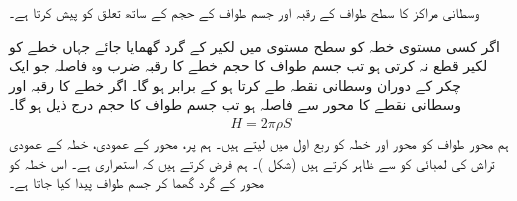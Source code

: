وسطانی مراکز کا سطح طواف کے رقبہ اور جسم طواف کے حجم کے ساتھ تعلق کو  پیش کرتا ہے۔

اگر کسی مستوی خطہ کو سطح مستوی میں لکیر کے گرد گھمایا جائے جہاں خطے کو لکیر قطع نہ کرتی ہو تب جسم طواف کا حجم خطے کا رقبہ ضرب وہ فاصلہ جو ایک چکر کے دوران وسطانی نقطہ طے کرتا ہو کے برابر ہو گا۔ اگر خطے کا رقبہ  اور وسطانی نقطے کا محور سے فاصلہ  ہو تب جسم طواف کا حجم درج ذیل ہو گا۔ 
\begin{align}\label{مساوات_تکمل_استعمال_مسئلہ_پاپس_الف}
H=2\pi \rho S
\end{align}
ہم محور طواف کو محور   اور خطہ  کو ربع اول میں لیتے ہیں۔ ہم  پر، محور  کے عمودی، خطہ کے عمودی تراش کی لمبائی کو  سے ظاہر کرتے ہیں (شکل )۔ ہم فرض کرتے ہیں کہ  استمراری ہے۔ اس خطہ کو محور  کے گرد گھما کر جسم طواف پیدا کیا جاتا ہے۔

